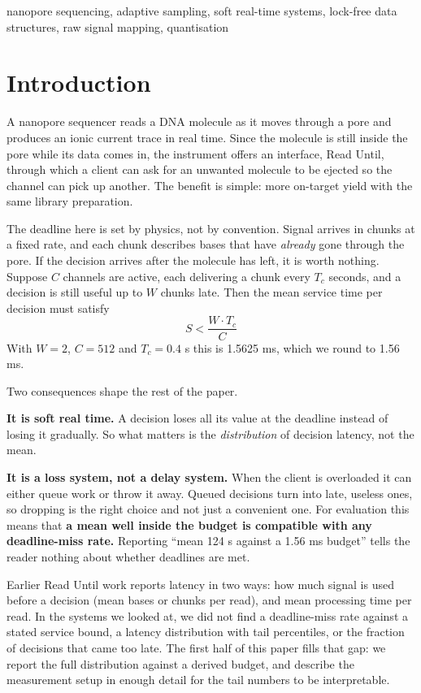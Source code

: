 \documentclass[conference]{IEEEtran}
\begin{document}
\begin{IEEEkeywords}
nanopore sequencing, adaptive sampling, soft real-time systems, lock-free data structures,
raw signal mapping, quantisation
\end{IEEEkeywords}

\section{Introduction}

A nanopore sequencer reads a DNA molecule as it moves through a pore and produces an ionic
current trace in real time. Since the molecule is still inside the pore while its data comes
in, the instrument offers an interface, Read Until, through which a client can ask for an
unwanted molecule to be ejected so the channel can pick up another. The benefit is simple:
more on-target yield with the same library preparation.

The deadline here is set by physics, not by convention. Signal arrives in chunks at a fixed
rate, and each chunk describes bases that have \emph{already} gone through the pore. If the
decision arrives after the molecule has left, it is worth nothing. Suppose $C$ channels are
active, each delivering a chunk every $T_c$ seconds, and a decision is still useful up to $W$
chunks late. Then the mean service time per decision must satisfy
\[ S < \frac{W \cdot T_c}{C} \]
With $W = 2$, $C = 512$ and $T_c = 0.4$ s this is 1.5625 ms, which we round to 1.56 ms.

Two consequences shape the rest of the paper.

\textbf{It is soft real time.} A decision loses all its value at the deadline instead of
losing it gradually. So what matters is the \emph{distribution} of decision latency, not the
mean.

\textbf{It is a loss system, not a delay system.} When the client is overloaded it can either
queue work or throw it away. Queued decisions turn into late, useless ones, so dropping is the
right choice and not just a convenient one. For evaluation this means that \textbf{a mean well
inside the budget is compatible with any deadline-miss rate.} Reporting ``mean 124 \textmu{}s
against a 1.56 ms budget'' tells the reader nothing about whether deadlines are met.

Earlier Read Until work reports latency in two ways: how much signal is used before a decision
(mean bases or chunks per read), and mean processing time per read. In the systems we looked
at, we did not find a deadline-miss rate against a stated service bound, a latency distribution
with tail percentiles, or the fraction of decisions that came too late. The first half of this
paper fills that gap: we report the full distribution against a derived budget, and describe
the measurement setup in enough detail for the tail numbers to be interpretable.
\end{document}
